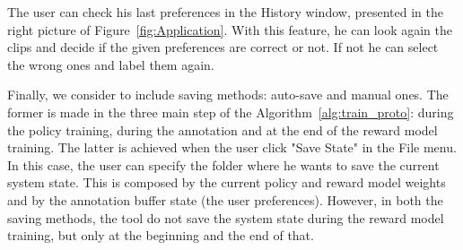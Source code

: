 The user can check his last preferences in the History window, presented in the right picture of Figure\ \ref{fig:Application}. With this feature, he can look again the clips and decide if the given preferences are correct or not. If not he can select the wrong ones and label them again.

Finally, we consider to include saving methods: auto-save and manual ones. The former is made in the three main step of the Algorithm\ \ref{alg:train_proto}: during the policy training, during the annotation and at the end of the reward model training. The latter is achieved when the user click "Save State" in the File menu. In this case, the user can specify the folder where he wants to save the current system state. This is composed by the current policy and reward model weights and by the annotation buffer state (the user preferences). However, in both the saving methods, the tool do not save the system state during the reward model training, but only at the beginning and the end of that. 